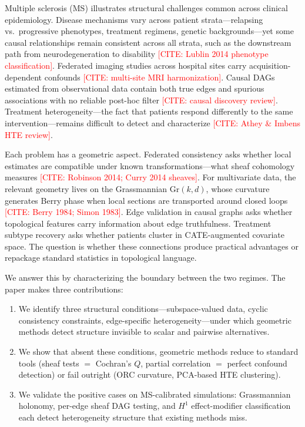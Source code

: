 \documentclass[11pt]{article}
\newcommand{\Gr}{\mathrm{Gr}}
\newcommand{\misscite}[1]{\textcolor{red}{[CITE: #1]}}
\begin{document}
Multiple sclerosis (MS) illustrates structural challenges common across clinical epidemiology.
Disease mechanisms vary across patient strata---relapsing vs.\ progressive phenotypes, treatment regimens, genetic backgrounds---yet some causal relationships remain consistent across all strata, such as the downstream path from neurodegeneration to disability \misscite{Lublin 2014 phenotype classification}.
Federated imaging studies across hospital sites carry acquisition-dependent confounds \misscite{multi-site MRI harmonization}.
Causal DAGs estimated from observational data contain both true edges and spurious associations with no reliable post-hoc filter \misscite{causal discovery review}.
Treatment heterogeneity---the fact that patients respond differently to the same intervention---remains difficult to detect and characterize \misscite{Athey \& Imbens HTE review}.

Each problem has a geometric aspect.
Federated consistency asks whether local estimates are compatible under known transformations---what sheaf cohomology measures \misscite{Robinson 2014; Curry 2014 sheaves}.
For multivariate data, the relevant geometry lives on the Grassmannian $\Gr(k,d)$, whose curvature generates Berry phase when local sections are transported around closed loops \misscite{Berry 1984; Simon 1983}.
Edge validation in causal graphs asks whether topological features carry information about edge truthfulness.
Treatment subtype recovery asks whether patients cluster in CATE-augmented covariate space.
The question is whether these connections produce practical advantages or repackage standard statistics in topological language.

We answer this by characterizing the boundary between the two regimes.
The paper makes three contributions:
\begin{enumerate}[nosep]
    \item We identify three structural conditions---subspace-valued data, cyclic consistency constraints, edge-specific heterogeneity---under which geometric methods detect structure invisible to scalar and pairwise alternatives.
    \item We show that absent these conditions, geometric methods reduce to standard tools (sheaf tests $=$ Cochran's $Q$, partial correlation $=$ perfect confound detection) or fail outright (ORC curvature, PCA-based HTE clustering).
    \item We validate the positive cases on MS-calibrated simulations: Grassmannian holonomy, per-edge sheaf DAG testing, and $H^1$ effect-modifier classification each detect heterogeneity structure that existing methods miss.
\end{enumerate}
\end{document}

